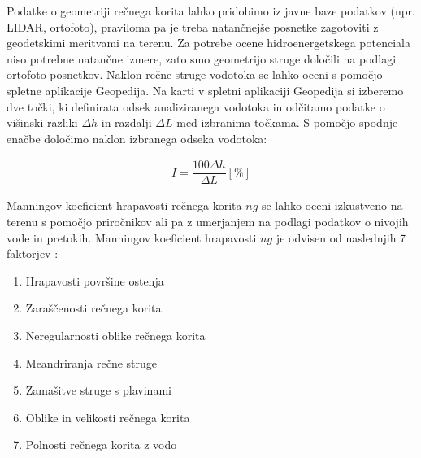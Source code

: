 Podatke o geometriji rečnega korita lahko pridobimo iz javne baze podatkov (npr. LIDAR, ortofoto), praviloma pa je treba natančnejše posnetke zagotoviti z geodetskimi meritvami na terenu. Za potrebe ocene hidroenergetskega potenciala niso potrebne natančne izmere, zato smo geometrijo struge določili na podlagi ortofoto posnetkov. Naklon rečne struge vodotoka se lahko oceni s pomočjo spletne aplikacije Geopedija. Na karti v spletni aplikaciji Geopedija si izberemo dve točki, ki definirata odsek analiziranega vodotoka in odčitamo podatke o višinski razliki $\Delta h$ in razdalji $\Delta L$ med izbranima točkama. S pomočjo spodnje enačbe določimo naklon izbranega odseka vodotoka:



\begin{ceqn}
\begin{align}
 I = \dfrac{100\Delta h}{\Delta L} [\%]
\end{align}
\end{ceqn}


  Manningov koeficient hrapavosti rečnega korita $ng$ se lahko oceni izkustveno na terenu s pomočjo priročnikov ali pa z umerjanjem na podlagi podatkov o nivojih vode in pretokih. Manningov koeficient hrapavosti $ng$ je odvisen od naslednjih 7 faktorjev \cite{VenTeChow}:
 \begin{enumerate}[noitemsep, topsep=0pt]
 	\item Hrapavosti površine ostenja
 	\item Zaraščenosti rečnega korita
 	\item Neregularnosti oblike rečnega korita
 	\item Meandriranja rečne struge
 	\item Zamašitve struge s plavinami 
 	\item Oblike in velikosti rečnega korita
 	\item Polnosti rečnega korita z vodo
 \end{enumerate}
 


